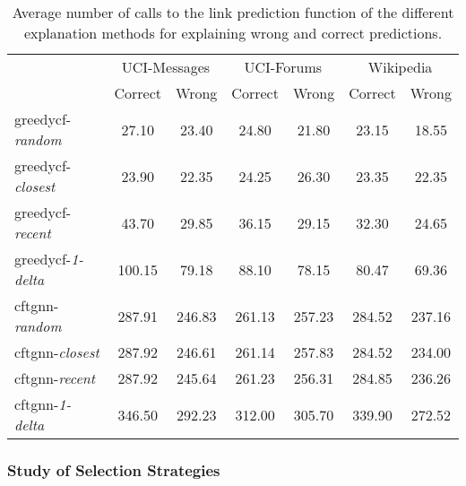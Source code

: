 \begin{table}
    \centering
    \small
    \begin{tabular}{lcccccc}
    \hline
         &  \multicolumn{2}{c}{UCI-Messages}&  \multicolumn{2}{c}{UCI-Forums}&  \multicolumn{2}{c}{Wikipedia}\\
         &  Correct&  Wrong&  Correct&  Wrong&  Correct& Wrong\\
         \hline
         \gls{greedycf}-\textit{random}&  27.10&  23.40&  24.80&  21.80&  23.15& 18.55\\
         \gls{greedycf}-\textit{closest}&  23.90&  22.35&  24.25&  26.30&  23.35& 22.35\\
         \gls{greedycf}-\textit{recent}&  43.70&  29.85&  36.15&  29.15&  32.30& 24.65\\
         \gls{greedycf}-\textit{1-delta}&  100.15&  79.18&  88.10&  78.15&  80.47& 69.36\\
         \gls{cftgnn}-\textit{random}&  287.91&  246.83&  261.13&  257.23&  284.52& 237.16\\
         \gls{cftgnn}-\textit{closest}&  287.92&  246.61&  261.14&  257.83&  284.52& 234.00\\
         \gls{cftgnn}-\textit{recent}&  287.92&  245.64&  261.23&  256.31&  284.85& 236.26\\
 \gls{cftgnn}-\textit{1-delta}& 346.50& 292.23& 312.00& 305.70& 339.90&272.52\\
 \hline
    \end{tabular}
    \caption{Average number of calls to the link prediction function of the different explanation methods for explaining wrong and correct predictions.}
    \label{t_oracle_calls}
\end{table}



\FloatBarrier

\subsubsection{Study of Selection Strategies}
\label{s_Evaluation_Results_SelectionStrategies}

